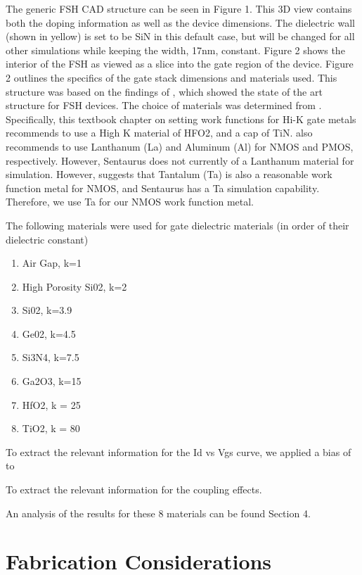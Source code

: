 \documentclass[letterpaper, 12 pt, conference]{ieeeconf}  %
\begin{document}
The generic FSH CAD structure can be seen in Figure 1. This 3D view contains both the doping information as well as the device dimensions. The dielectric wall (shown in yellow) is set to be SiN in this default case, but will be changed for all other simulations while keeping the width, 17nm, constant. Figure 2 shows the interior of the FSH as viewed as a slice into the gate region of the device. Figure 2 outlines the specifics of the gate stack dimensions and materials used. This structure was based on the findings of \cite{c1}, which showed the state of the art structure for FSH devices. The choice of materials was determined from \cite{c2}. Specifically, this textbook chapter on setting work functions for Hi-K gate metals recommends to use a High K material of HFO2, and a cap of TiN. \cite{c2} also recommends to use Lanthanum (La) and Aluminum (Al) for NMOS and PMOS, respectively. However, Sentaurus does not currently of a Lanthanum material for simulation. However, \cite{c3} suggests that Tantalum (Ta) is also a reasonable work function metal for NMOS, and Sentaurus has a Ta simulation capability. Therefore, we use Ta for our NMOS work function metal. 

The following materials were used for gate dielectric materials (in order of their dielectric constant)

\begin{enumerate}
    \item Air Gap, k=1
    \item High Porosity Si02, k=2
    \item Si02, k=3.9
    \item Ge02, k=4.5
    \item Si3N4, k=7.5
    \item Ga2O3, k=15
    \item HfO2, k = 25
    \item TiO2, k = 80
\end{enumerate}

To extract the relevant information for the Id vs Vgs curve, we applied a bias of  to

To extract the relevant information for the coupling effects.

An analysis of the results for these 8 materials can be found Section 4.
 
 
\section{Fabrication Considerations}
\end{document}
